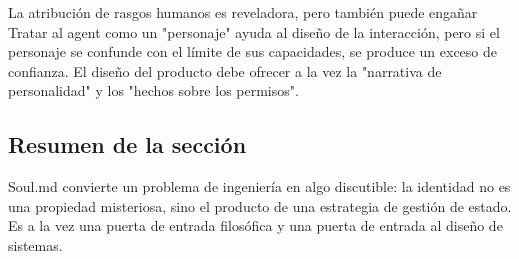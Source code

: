 \begin{warningbox}{La atribución de rasgos humanos es reveladora, pero también puede engañar}
Tratar al agent como un "personaje" ayuda al diseño de la interacción, pero si el personaje se confunde con el límite de sus capacidades, se produce un exceso de confianza. El diseño del producto debe ofrecer a la vez la "narrativa de personalidad" y los "hechos sobre los permisos".
\end{warningbox}

\subsection{Resumen de la sección}
Soul.md convierte un problema de ingeniería en algo discutible: la identidad no es una propiedad misteriosa, sino el producto de una estrategia de gestión de estado. Es a la vez una puerta de entrada filosófica y una puerta de entrada al diseño de sistemas.

